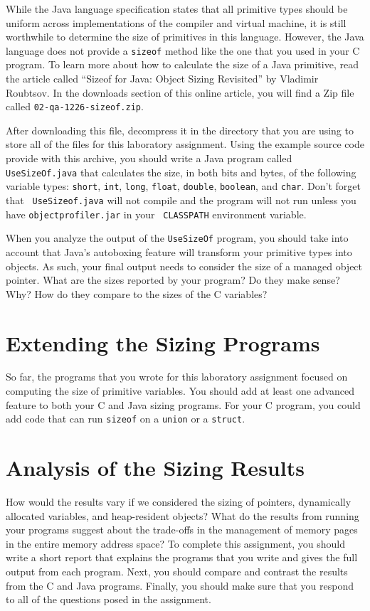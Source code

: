   While the Java language specification states that all primitive types should be uniform across implementations of the
  compiler and virtual machine, it is still worthwhile to determine the size of primitives in this language. However,
  the Java language does not provide a {\tt sizeof} method like the one that you used in your C program. To learn more
  about how to calculate the size of a Java primitive, read the article called ``Sizeof for Java: Object Sizing
  Revisited'' by Vladimir Roubtsov. In the downloads section of this online article, you will find a Zip file called
  {\tt 02-qa-1226-sizeof.zip}. 

  After downloading this file, decompress it in the directory that you are using to store all of the files for this
  laboratory assignment. Using the example source code provide with this archive, you should write a Java program called
  {\tt UseSizeOf.java} that calculates the size, in both bits and bytes, of the following variable types:  {\tt short},
  {\tt int}, {\tt long}, {\tt float}, {\tt double}, {\tt boolean}, and {\tt char}. Don't forget that {\tt
  UseSizeof.java} will not compile and the program will not run unless you have {\tt objectprofiler.jar} in your {\tt
  CLASSPATH} environment variable. 
  
  When you analyze the output of the {\tt UseSizeOf} program, you should take into account that Java's autoboxing
  feature will transform your primitive types into objects.  As such, your final output needs to consider the size of a
  managed object pointer. What are the sizes reported by your program? Do they make sense? Why? How do they compare to
  the sizes of the C variables?

\section*{Extending the Sizing Programs}

  So far, the programs that you wrote for this laboratory assignment focused on computing the size of primitive
  variables.  You should add at least one advanced feature to both your C and Java sizing programs.  For your C program,
  you could add code that can run {\tt sizeof} on a {\tt union} or a {\tt struct}.

\section*{Analysis of the Sizing Results}

  How would the results vary if we
  considered the sizing of pointers, dynamically allocated variables, and heap-resident objects? What do the results
  from running your programs suggest about the trade-offs in the management of memory pages in the entire memory address
  space? To complete this assignment, you should write a short report that explains the programs that you write and
  gives the full output from each program.  Next, you should compare and contrast the results from the C and Java
  programs. Finally, you should make sure that you respond to all of the questions posed in the assignment.

